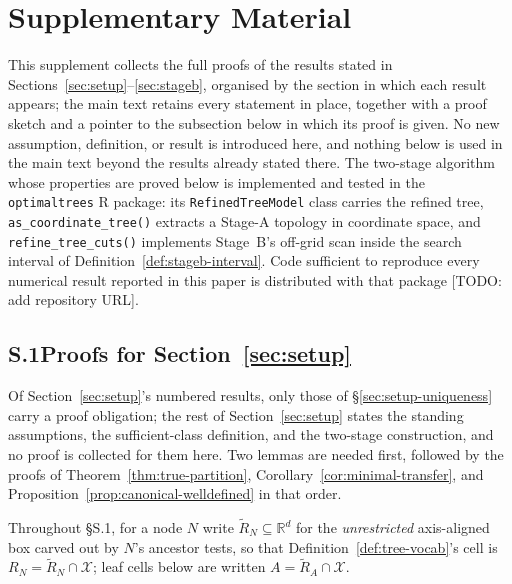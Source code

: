 \documentclass[11pt]{article}
\theoremstyle{plain}
\theoremstyle{definition}
\theoremstyle{remark}
\newcommand{\R}{\mathbb{R}}
\newcommand{\cX}{\mathcal{X}}
\begin{document}
\section*{Supplementary Material}\label{sec:supplement}

This supplement collects the full proofs of the results stated in
Sections~\ref{sec:setup}--\ref{sec:stageb}, organised by the section in which
each result appears; the main text retains every statement in place, together
with a proof sketch and a pointer to the subsection below in which its proof is
given. No new assumption, definition, or result is introduced here, and
nothing below is used in the main text beyond the results already stated
there. The two-stage algorithm whose properties are proved below is
implemented and tested in the \texttt{optimaltrees} \textsf{R} package: its
\texttt{RefinedTreeModel} class carries the refined tree,
\texttt{as\_coordinate\_tree()} extracts a Stage-A topology in coordinate
space, and \texttt{refine\_tree\_cuts()} implements Stage~B's off-grid scan
inside the search interval of Definition~\ref{def:stageb-interval}. Code
sufficient to reproduce every numerical result reported in this paper is
distributed with that package [TODO: add repository URL].


\subsection*{S.1\quad Proofs for Section~\ref{sec:setup}}\label{sec:supp-setup}

Of Section~\ref{sec:setup}'s numbered results, only those of
\S\ref{sec:setup-uniqueness} carry a proof obligation; the rest of
Section~\ref{sec:setup} states the standing assumptions, the
sufficient-class definition, and the two-stage construction, and no proof is
collected for them here. Two lemmas are needed first, followed by the
proofs of Theorem~\ref{thm:true-partition}, Corollary~\ref{cor:minimal-transfer},
and Proposition~\ref{prop:canonical-welldefined} in that order.


Throughout \S S.1, for a node \(N\) write \(\widetilde R_N\subseteq\R^d\)
for the \emph{unrestricted} axis-aligned box carved out by \(N\)'s ancestor
tests, so that Definition~\ref{def:tree-vocab}'s cell is
\(R_N=\widetilde R_N\cap\cX\); leaf cells below are written
\(A=\widetilde R_A\cap\cX\).
\end{document}
